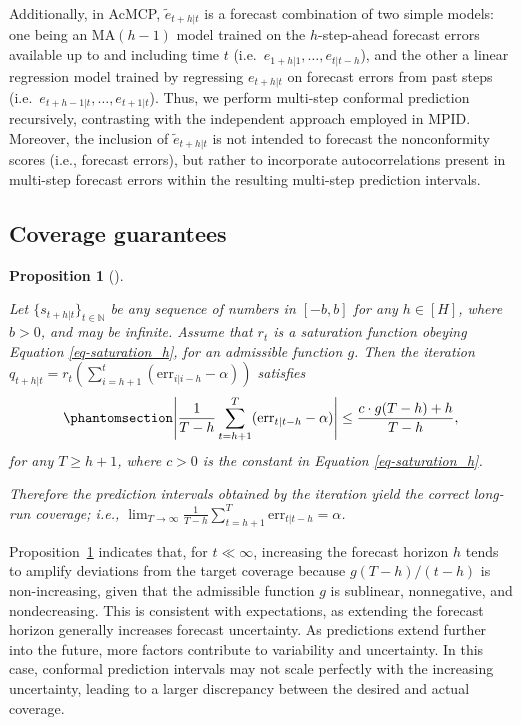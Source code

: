 \documentclass[
  11pt,
  12pt]{article}
\theoremstyle{plain}
\newtheorem{proposition}{Proposition}[section]
\theoremstyle{remark}
\begin{document}
Additionally, in AcMCP, \(\tilde{e}_{t+h|t}\) is a forecast combination
of two simple models: one being an MA\((h-1)\) model trained on the
\(h\)-step-ahead forecast errors available up to and including time
\(t\) (i.e.~\(e_{1+h|1}, \ldots, e_{t|t-h}\)), and the other a linear
regression model trained by regressing \(e_{t+h|t}\) on forecast errors
from past steps (i.e.~\(e_{t+h-1|t}, \ldots, e_{t+1|t}\)). Thus, we
perform multi-step conformal prediction recursively, contrasting with
the independent approach employed in MPID. Moreover, the inclusion of
\(\tilde{e}_{t+h|t}\) is not intended to forecast the nonconformity
scores (i.e., forecast errors), but rather to incorporate
autocorrelations present in multi-step forecast errors within the
resulting multi-step prediction intervals.

\subsection{Coverage guarantees}\label{coverage-guarantees}

\begin{proposition}[]\protect\hypertarget{prp-cov_rt}{}\label{prp-cov_rt}

Let \(\{s_{t+h|t}\}_{t\in\mathbb{N}}\) be any sequence of numbers in
\([-b, b]\) for any \(h\in[H]\), where \(b>0\), and may be infinite.
Assume that \(r_t\) is a saturation function obeying Equation
\eqref{eq-saturation_h}, for an admissible function \(g\). Then the
iteration
\(q_{t+h|t}=r_t\left(\sum_{i=h+1}^t(\mathrm{err}_{i|i-h}-\alpha)\right)\)
satisfies \begin{equation}\phantomsection\label{eq-cov_rt}{
\left|\frac{1}{T-h}\sum_{t=h+1}^{T}(\mathrm{err}_{t|t-h}-\alpha)\right| \leq \frac{c \cdot g(T-h) + h}{T-h},
}\end{equation} for any \(T \geq h+1\), where \(c>0\) is the constant in
Equation \eqref{eq-saturation_h}.

Therefore the prediction intervals obtained by the iteration yield the
correct long-run coverage; i.e.,
\(\lim _{T \rightarrow \infty} \frac{1}{T-h} \sum_{t=h+1}^T \mathrm{err}_{t|t-h} = \alpha\).

\end{proposition}

Proposition~\ref{prp-cov_rt} indicates that, for \(t \ll \infty\),
increasing the forecast horizon \(h\) tends to amplify deviations from
the target coverage because \(g(T-h)/(t-h)\) is non-increasing, given
that the admissible function \(g\) is sublinear, nonnegative, and
nondecreasing. This is consistent with expectations, as extending the
forecast horizon generally increases forecast uncertainty. As
predictions extend further into the future, more factors contribute to
variability and uncertainty. In this case, conformal prediction
intervals may not scale perfectly with the increasing uncertainty,
leading to a larger discrepancy between the desired and actual coverage.
\end{document}
